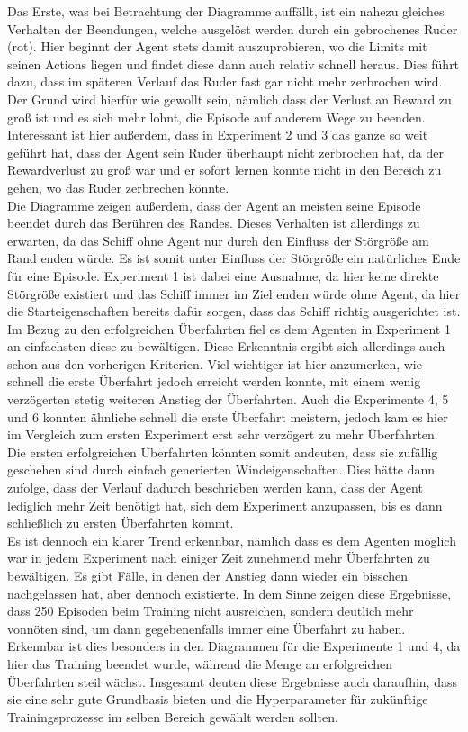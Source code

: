 \documentclass[]{iat}
\begin{document}
Das Erste, was bei Betrachtung der Diagramme auffällt, ist ein nahezu gleiches Verhalten der Beendungen, welche ausgelöst werden durch ein gebrochenes Ruder (rot). Hier beginnt der Agent stets damit auszuprobieren, wo die Limits mit seinen Actions liegen und findet diese dann auch relativ schnell heraus. Dies führt dazu, dass im späteren Verlauf das Ruder fast gar nicht mehr zerbrochen wird. Der Grund wird hierfür wie gewollt sein, nämlich dass der Verlust an Reward zu groß ist und es sich mehr lohnt, die Episode auf anderem Wege zu beenden. Interessant ist hier außerdem, dass in Experiment 2 und 3 das ganze so weit geführt hat, dass der Agent sein Ruder überhaupt nicht zerbrochen hat, da der Rewardverlust zu groß war und er sofort lernen konnte nicht in den Bereich zu gehen, wo das Ruder zerbrechen könnte.\\
Die Diagramme zeigen außerdem, dass der Agent an meisten seine Episode beendet durch das Berühren des Randes. Dieses Verhalten ist allerdings zu erwarten, da das Schiff ohne Agent nur durch den Einfluss der Störgröße am Rand enden würde. Es ist somit unter Einfluss der Störgröße ein natürliches Ende für eine Episode. Experiment 1 ist dabei eine Ausnahme, da hier keine direkte Störgröße existiert und das Schiff immer im Ziel enden würde ohne Agent, da hier die Starteigenschaften bereits dafür sorgen, dass das Schiff richtig ausgerichtet ist.\\
Im Bezug zu den erfolgreichen Überfahrten fiel es dem Agenten in Experiment 1 an einfachsten diese zu bewältigen. Diese Erkenntnis ergibt sich allerdings auch schon aus den vorherigen Kriterien. Viel wichtiger ist hier anzumerken, wie schnell die erste Überfahrt jedoch erreicht werden konnte, mit einem wenig verzögerten stetig weiteren Anstieg der Überfahrten. Auch die Experimente 4, 5 und 6 konnten ähnliche schnell die erste Überfahrt meistern, jedoch kam es hier im Vergleich zum ersten Experiment erst sehr verzögert zu mehr Überfahrten. Die ersten erfolgreichen Überfahrten könnten somit andeuten, dass sie zufällig geschehen sind durch einfach generierten Windeigenschaften. Dies hätte dann zufolge, dass der Verlauf dadurch beschrieben werden kann, dass der Agent lediglich mehr Zeit benötigt hat, sich dem Experiment anzupassen, bis es dann schließlich zu ersten Überfahrten kommt.\\
Es ist dennoch ein klarer Trend erkennbar, nämlich dass es dem Agenten möglich war in jedem Experiment nach einiger Zeit zunehmend mehr Überfahrten zu bewältigen. Es gibt Fälle, in denen der Anstieg dann wieder ein bisschen nachgelassen hat, aber dennoch existierte. In dem Sinne zeigen diese Ergebnisse, dass 250 Episoden beim Training nicht ausreichen, sondern deutlich mehr vonnöten sind, um dann gegebenenfalls immer eine Überfahrt zu haben. Erkennbar ist dies besonders in den Diagrammen für die Experimente 1 und 4, da hier das Training beendet wurde, während die Menge an erfolgreichen Überfahrten steil wächst. Insgesamt deuten diese Ergebnisse auch daraufhin, dass sie eine sehr gute Grundbasis bieten und die Hyperparameter für zukünftige Trainingsprozesse im selben Bereich gewählt werden sollten.
\end{document}
